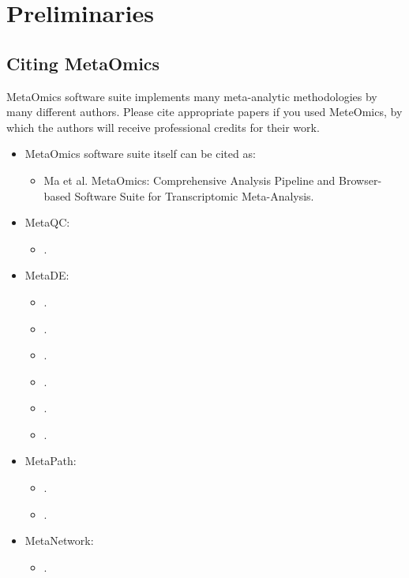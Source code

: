 \section{Preliminaries}
\subsection{Citing MetaOmics}
MetaOmics software suite implements many meta-analytic methodologies by many different authors. 
Please cite appropriate papers if you used MeteOmics,
by which the authors will receive professional credits for their work.

\begin{itemize}

\item MetaOmics software suite  itself can be cited as: 

\begin{itemize}
\item Ma et al. MetaOmics: Comprehensive Analysis Pipeline and Browser-based Software Suite for Transcriptomic Meta-Analysis.
\end{itemize}

\item MetaQC: 
\begin{itemize}
\item {}.
\end{itemize}

\item MetaDE: 
\begin{itemize}
\item {}.
\item {}.
\item {}.
\item {}.
\item {}.
\item {}.
\end{itemize}

\item MetaPath: 
\begin{itemize}
\item {}.
\item {}.
\end{itemize}

\item MetaNetwork: 
\begin{itemize}
\item {}.
\end{itemize}


\end{itemize}
